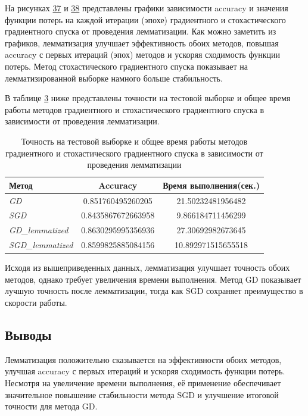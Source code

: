 \documentclass[14pt]{extarticle}
\begin{document}
На рисунках \hyperref[fig:exp_7_acc]{37} и \hyperref[fig:exp_7_loss]{38} представлены графики зависимости accuracy и значения функции потерь на каждой итерации (эпохе) градиентного и  стохастического градиентного спуска от проведения лемматизации. Как можно заметить из графиков, лемматизация улучшает эффективность обоих методов, повышая accuracy с первых итераций (эпох) методов и ускоряя сходимость функции потерь. Метод стохастического градиентного спуска показывает на лемматизированной выборке намного больше стабильность.

В таблице \hyperref[tab:exp_6_acc_time]{3} ниже представлены точности на тестовой выборке и общее время работы методов градиентного и стохастического градиентного спуска в зависимости от проведения лемматизации.

\begin{table}[H]
    \centering
    \begin{tabular}{|l|c|c|}
        \hline
        Метод & Accuracy & Время выполнения(сек.) \\ \hline
        \textit{GD} & 0.851760495260205 & 21.50232481956482 \\ \hline
        \textit{SGD} & 0.8435867672663958 & 9.866184711456299 \\ \hline
        \textit{GD\_lemmatized} & 0.8630295995356936 & 27.30692982673645 \\ \hline
        \textit{SGD\_lemmatized} & 0.8599825885084156 & 10.892971515655518 \\ \hline
    \end{tabular}
    \caption{Точность на тестовой выборке и общее время работы методов градиентного и стохастического градиентного спуска в зависимости от проведения лемматизации}
    \label{tab:exp_7_acc_time}
\end{table}

Исходя из вышеприведенных данных, лемматизация улучшает точность обоих методов, однако требует увеличения времени выполнения. Метод GD показывает лучшую точность после лемматизации, тогда как SGD сохраняет преимущество в скорости работы.

\subsection{Выводы}

Лемматизация положительно сказывается на эффективности обоих методов, улучшая accuracy с первых итераций и ускоряя сходимость функции потерь. Несмотря на увеличение времени выполнения, её применение обеспечивает значительное повышение стабильности метода SGD и улучшение итоговой точности для метода GD.
\end{document}
